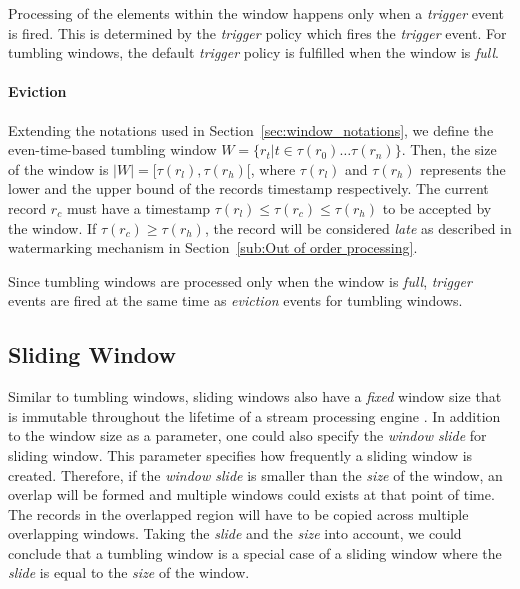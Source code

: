Processing of the elements within the window happens only when a \emph{trigger}
event is fired. This is determined by the \emph{trigger} policy which fires the 
\emph{trigger} event. For tumbling windows, the default \emph{trigger} policy is 
fulfilled when the window is \emph{full}.


\paragraph{Eviction}%
Extending the notations used in Section~\ref{sec:window_notations}, we define 
the even-time-based  tumbling window $W = \{r_t |  t \in \tau(r_0) \dots \tau(r_n) \}$. 
Then, the size of the window is $|W| = [\tau(r_l), \tau(r_h)[$, where  
$\tau(r_l)$ and $\tau(r_h)$ represents the lower and the upper bound of the 
records timestamp respectively. 
The current record $r_c$ must have a timestamp  $\tau(r_l) \le \tau(r_c) \le \tau(r_h)$ 
to be accepted by the window. If $\tau(r_c) \ge \tau(r_h)$, the record will be 
considered \emph{late} as described in watermarking mechanism in Section~\ref{sub:Out of order processing}. 


Since tumbling windows are processed only when the window is \emph{full}, \emph{trigger} events 
are fired at the same time as \emph{eviction} events for tumbling windows.


\subsection{Sliding Window}%
\label{sec:Sliding Window}
Similar to tumbling windows, sliding windows also have a \emph{fixed} window size 
that is immutable throughout the lifetime of a stream processing engine . 
In addition to the window size as a parameter, one could also specify the 
\emph{window slide} for sliding window. This parameter specifies how frequently 
a sliding window is created. 
Therefore, if the \emph{window slide} is smaller 
than the \emph{size} of the window, an overlap will be formed and multiple 
windows could exists at that point of time. The records in the overlapped region 
will have to be copied across multiple overlapping windows. 
Taking the \emph{slide} and the \emph{size} into account, we could conclude that 
a tumbling window is a special case of a sliding window where the \emph{slide} is 
equal to the \emph{size} of the window.

